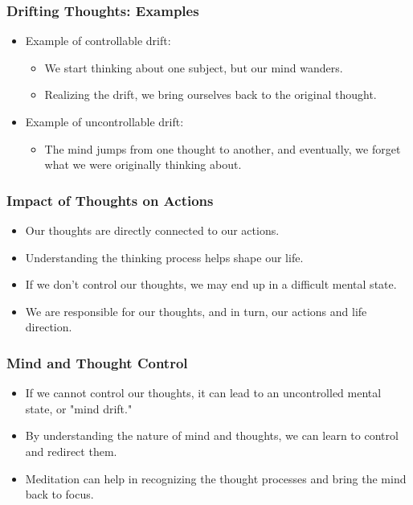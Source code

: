\begin{frame}[fragile]\frametitle{Drifting Thoughts: Examples}

\begin{itemize}
    \item Example of controllable drift: 
        \begin{itemize}
            \item We start thinking about one subject, but our mind wanders. 
            \item Realizing the drift, we bring ourselves back to the original thought.
        \end{itemize}
    \item Example of uncontrollable drift: 
        \begin{itemize}
            \item The mind jumps from one thought to another, and eventually, we forget what we were originally thinking about.
        \end{itemize}
\end{itemize}

\end{frame}

\begin{frame}[fragile]\frametitle{Impact of Thoughts on Actions}

\begin{itemize}
    \item Our thoughts are directly connected to our actions.
    \item Understanding the thinking process helps shape our life.
    \item If we don’t control our thoughts, we may end up in a difficult mental state.
    \item We are responsible for our thoughts, and in turn, our actions and life direction.
\end{itemize}

\end{frame}

\begin{frame}[fragile]\frametitle{Mind and Thought Control}

\begin{itemize}
    \item If we cannot control our thoughts, it can lead to an uncontrolled mental state, or "mind drift."
    \item By understanding the nature of mind and thoughts, we can learn to control and redirect them.
    \item Meditation can help in recognizing the thought processes and bring the mind back to focus.
\end{itemize}

\end{frame}

